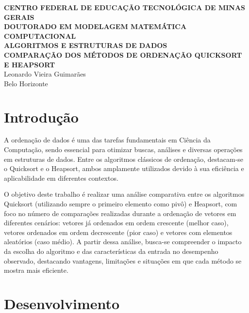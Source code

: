\documentclass[12pt]{article}
\begin{document}
\begin{titlepage}
\begin{center}
    \large
    \textbf{CENTRO FEDERAL DE EDUCAÇÃO TECNOLÓGICA DE MINAS GERAIS}\\
    \textbf{DOUTORADO EM MODELAGEM MATEMÁTICA COMPUTACIONAL}\\
    \textbf{ALGORITMOS E ESTRUTURAS DE DADOS}\\
    \vspace{4cm}
    \textbf{COMPARAÇÃO DOS MÉTODOS DE ORDENAÇÃO QUICKSORT E HEAPSORT}\\
    \vspace{4cm}
    Leonardo Vieira Guimarães\\
    \vfill
    Belo Horizonte\\
    \the\year
\end{center}
\thispagestyle{empty}
\end{titlepage}


\newpage
{}

\tableofcontents
\newpage

\section{Introdução}
A ordenação de dados é uma das tarefas fundamentais em Ciência da Computação, sendo essencial para otimizar buscas, análises e diversas operações em estruturas de dados. Entre os algoritmos clássicos de ordenação, destacam-se o Quicksort e o Heapsort, ambos amplamente utilizados devido à sua eficiência e aplicabilidade em diferentes contextos.

O objetivo deste trabalho é realizar uma análise comparativa entre os algoritmos Quicksort (utilizando sempre o primeiro elemento como pivô) e Heapsort, com foco no número de comparações realizadas durante a ordenação de vetores em diferentes cenários: vetores já ordenados em ordem crescente (melhor caso), vetores ordenados em ordem decrescente (pior caso) e vetores com elementos aleatórios (caso médio). A partir dessa análise, busca-se compreender o impacto da escolha do algoritmo e das características da entrada no desempenho observado, destacando vantagens, limitações e situações em que cada método se mostra mais eficiente.

\section{Desenvolvimento}
\end{document}
